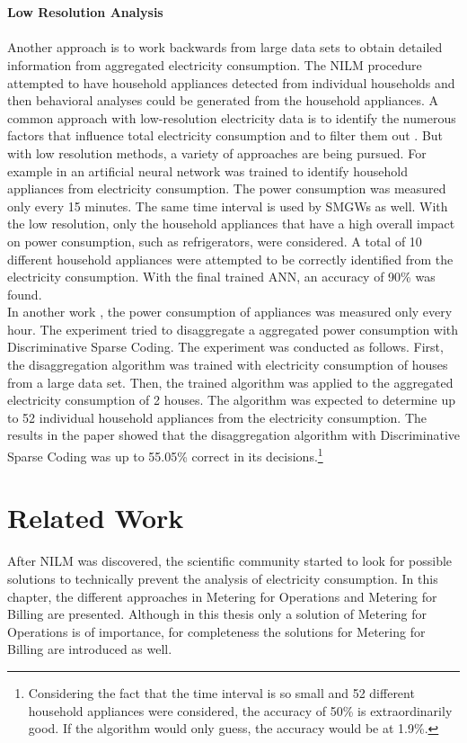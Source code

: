 \\
\\
\textbf{Low Resolution Analysis}
\label{subsec:low_reso}
\\
\\Another approach is to work backwards from large data sets to obtain detailed information from aggregated electricity consumption. The NILM procedure attempted to have household appliances detected from individual households and then behavioral analyses could be generated from the household appliances. A common approach with low-resolution electricity data is to identify the numerous factors that influence total electricity consumption and to filter them out \cite{quinn2009privacy}.
But with low resolution methods, a variety of approaches are being pursued.
For example in \cite{prudenzi2002neuron} an artificial neural network was trained to identify household appliances from electricity consumption. The power consumption was measured only every 15 minutes. The same time interval is used by SMGWs as well. With the low resolution, only the household appliances that have a high overall impact on power consumption, such as refrigerators, were considered. A total of 10 different household appliances were attempted to be correctly identified from the electricity consumption. With the final trained ANN, an accuracy of 90\% was found.
\\%
In another work \cite{kolter2010energy}, the power consumption of appliances was measured only every hour. The experiment tried to disaggregate a aggregated power consumption with Discriminative Sparse Coding. The experiment was conducted as follows. First, the disaggregation algorithm was trained with electricity consumption of houses from a large data set. Then, the trained algorithm was applied to the aggregated electricity consumption of 2 houses. The algorithm was expected to determine up to 52 individual household appliances from the electricity consumption. The results in the paper showed that the disaggregation algorithm with Discriminative Sparse Coding was up to 55.05\% correct in its decisions.\footnote[2]{Considering the fact that the time interval is so small and 52 different household appliances were considered, the accuracy of 50\% is extraordinarily good. If the algorithm would only guess, the accuracy would be at 1.9\%.}

\section{Related Work}
After NILM was discovered, the scientific community started to look for possible solutions to technically prevent the analysis of electricity consumption. In this chapter, the different approaches in Metering for Operations and Metering for Billing are presented. Although in this thesis only a solution of Metering for Operations is of importance, for completeness the solutions for Metering for Billing are introduced as well.

